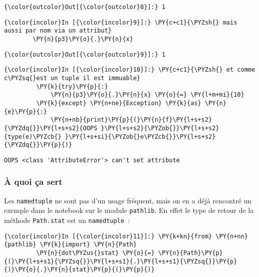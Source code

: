 \begin{Verbatim}[commandchars=\\\{\}]
{\color{outcolor}Out[{\color{outcolor}8}]:} 1
\end{Verbatim}
            
    \begin{Verbatim}[commandchars=\\\{\}]
{\color{incolor}In [{\color{incolor}9}]:} \PY{c+c1}{\PYZsh{} mais aussi par nom via un attribut}
        \PY{n}{p3}\PY{o}{.}\PY{n}{x}
\end{Verbatim}


\begin{Verbatim}[commandchars=\\\{\}]
{\color{outcolor}Out[{\color{outcolor}9}]:} 1
\end{Verbatim}
            
    \begin{Verbatim}[commandchars=\\\{\}]
{\color{incolor}In [{\color{incolor}10}]:} \PY{c+c1}{\PYZsh{} et comme c\PYZsq{}est un tuple il est immuable}
         \PY{k}{try}\PY{p}{:}
             \PY{n}{p3}\PY{o}{.}\PY{n}{x} \PY{o}{=} \PY{l+m+mi}{10}
         \PY{k}{except} \PY{n+ne}{Exception} \PY{k}{as} \PY{n}{e}\PY{p}{:}
             \PY{n+nb}{print}\PY{p}{(}\PY{n}{f}\PY{l+s+s2}{\PYZdq{}}\PY{l+s+s2}{OOPS }\PY{l+s+s2}{\PYZob{}}\PY{l+s+s2}{type(e)\PYZcb{} }\PY{l+s+si}{\PYZob{}e\PYZcb{}}\PY{l+s+s2}{\PYZdq{}}\PY{p}{)}
\end{Verbatim}


    \begin{Verbatim}[commandchars=\\\{\}]
OOPS <class 'AttributeError'> can't set attribute

    \end{Verbatim}

    \hypertarget{uxe0-quoi-uxe7a-sert}{%
\subsubsection{À quoi ça sert}\label{uxe0-quoi-uxe7a-sert}}

    Les \texttt{namedtuple} ne sont pas d'un usage fréquent, mais on en a
déjà rencontré un exemple dans le notebook sur le module
\texttt{pathlib}. En effet le type de retour de la méthode
\texttt{Path.stat} est un \texttt{namedtuple}~:

    \begin{Verbatim}[commandchars=\\\{\}]
{\color{incolor}In [{\color{incolor}11}]:} \PY{k+kn}{from} \PY{n+nn}{pathlib} \PY{k}{import} \PY{n}{Path}
         \PY{n}{dot\PYZus{}stat} \PY{o}{=} \PY{n}{Path}\PY{p}{(}\PY{l+s+s1}{\PYZsq{}}\PY{l+s+s1}{.}\PY{l+s+s1}{\PYZsq{}}\PY{p}{)}\PY{o}{.}\PY{n}{stat}\PY{p}{(}\PY{p}{)}
\end{Verbatim}


